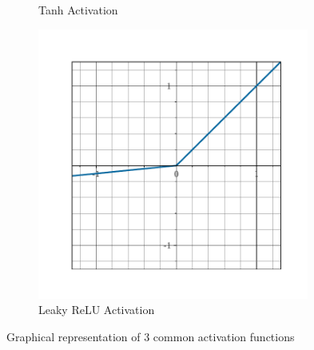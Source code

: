 \begin{figure}[t]
\begin{subfigure}[b]{0.32\textwidth}
    \caption{Tanh Activation}
  \end{subfigure}
  \hfill
  \begin{subfigure}[b]{0.32\textwidth}
    \includegraphics[width=0.98\textwidth]{figures/main/ch2-background/relu.pdf}
    \caption{Leaky ReLU Activation}
  \end{subfigure}
  \caption{Graphical representation of 3 common activation functions}
  \label{figure:ch2-activation_functions}
\end{figure}


